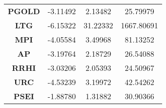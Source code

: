 \begin{longtable}[c]{cccc}
    \textbf{PGOLD} & -3.11492                                                                 & 2.13482                                                             & 25.79979                                                          \\
    \textbf{LTG}   & -6.15322                                                                 & 31.22332                                                            & 1667.80691                                                        \\
    \textbf{MPI}   & -4.05584                                                                 & 3.49968                                                             & 81.13252                                                          \\
    \textbf{AP}    & -3.19764                                                                 & 2.18729                                                             & 26.54088                                                          \\
    \textbf{RRHI}  & -3.03206                                                                 & 2.05393                                                             & 24.50967                                                          \\
    \textbf{URC}   & -4.53239                                                                 & 3.19972                                                             & 42.54262                                                          \\
    \textbf{PSEI}  & -1.88780                                                                 & 1.31882                                                             & 30.90366                                                          \\ \hline
\end{longtable}